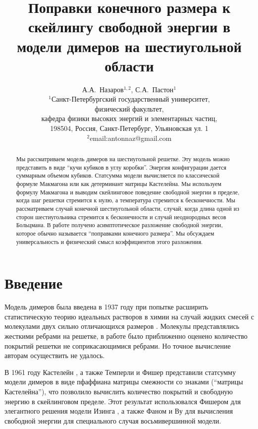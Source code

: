 \documentclass{article}
\begin{document}
\title{Поправки конечного размера к скейлингу свободной энергии в модели димеров на шестиугольной области}

\author{А.А.~Назаров$^{1,2}$, С.А.~Пастон$^{1}$\\
{\small
  $^{1}$Санкт-Петербургский государственный университет,}\\{\small физический факультет, }\\{\small кафедра физики высоких энергий и элементарных частиц,} \\
{\small 198504, Россия, Санкт-Петербург, Ульяновская ул. 1}\\
\small{$^{2}$email:antonnaz@gmail.com}
}
\date{}
\maketitle
\begin{abstract}
  Мы рассматриваем модель димеров на шестиугольной решетке. Эту
  модель можно представить в виде ``кучи кубиков в углу коробки''.
  Энергия конфигурации дается суммарным объемом кубиков. Статсумма
  модели вычисляется по классической формуле Макмагона или как
  детерминант матрицы Кастелейна. Мы используем формулу Макмагона и
  выводим скейлинговое поведение свободной энергии в пределе, когда
  шаг решетки стремится к нулю, а температура стремится к
  бесконечности. Мы рассматриваем случай конечной шестиугольной
  области, случай, когда длина одной из сторон шестиугольника
  стремится к бесконечности и случай неоднородных весов Больцмана. В
  работе получено асимптотическое разложение свободной энергии,
  которое обычно называется ``поправками конечного размера''. Мы
  обсуждаем универсальность и физический смысл коэффициентов этого
  разложения.
\end{abstract}

\section*{Введение}
\label{sec:introduction}

Модель димеров была введена в 1937 году при попытке расширить статистическую теорию идеальных
растворов в химии на случай жидких смесей с молекулами двух сильно отличающихся размеров
\cite{Fowler-1937}. Молекулы представлялись жесткими ребрами на решетке, в работе было приближенно
оценено количество покрытий решетки не соприкасающимися ребрами. Но точное вычисление авторам
осуществить не удалось.

В 1961 году Кастелейн \cite{P.W-1961}, а также Темперли и Фишер \cite{doi:10.1080/14786436108243366}
представили статсумму модели димеров в виде пфаффиана матрицы смежности со знаками (``матрицы
Кастелейна''), что позволило вычислить количество покрытий и свободную энергию в скейлинговом
пределе. Этот результат использовался Фишером для элегантного решения модели Изинга
\cite{fisher1966dimer}, а также Фаном и Ву \cite{Fan-1970} для вычисления свободной энергии для
специального случая восьмивершинной модели.
\end{document}
